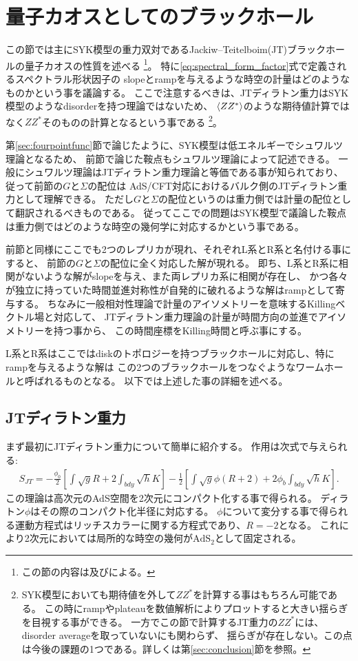 \section{量子カオスとしてのブラックホール\label{sec:gravity}}
この節では主にSYK模型の重力双対であるJackiw--Teitelboim(JT)ブラックホールの量子カオスの性質を述べる
\footnote{この節の内容は\cite{polchinski_chaos}及び\cite{stanford_chaos}による。}。
特に\eqref{eq:spectral_form_factor}式で定義されるスペクトラル形状因子の
slopeとrampを与えるような時空の計量はどのようなものかという事を議論する。
ここで注意するべきは、JTディラトン重力はSYK模型のようなdisorderを持つ理論ではないため、
$\langle ZZ^* \rangle$のような期待値計算ではなく$ZZ^*$そのものの計算となるという事である
\footnote{SYK模型においても期待値を外して$ZZ^*$を計算する事はもちろん可能である。
この時にrampやplateauを数値解析によりプロットすると大きい揺らぎを目視する事ができる。
一方でこの節で計算するJT重力の$ZZ^*$には、disorder averageを取っていないにも関わらず、
揺らぎが存在しない。この点は今後の課題の1つである。詳しくは第\ref{sec:conclusion}節を参照。}。

第\ref{sec:fourpointfunc}節で論じたように、SYK模型は低エネルギーでシュワルツ理論となるため、
前節で論じた鞍点もシュワルツ理論によって記述できる。
一般にシュワルツ理論はJTディラトン重力理論と等価である事が知られており、従って前節の$G$と$\Sigma$の配位は
AdS/CFT対応におけるバルク側のJTディラトン重力として理解できる。
ただし$G$と$\Sigma$の配位というのは重力側では計量の配位として翻訳されるべきものである。
従ってここでの問題はSYK模型で議論した鞍点は重力側ではどのような時空の幾何学に対応するかという事である。

前節と同様にここでも2つのレプリカが現れ、それぞれL系とR系と名付ける事にすると、
前節の$G$と$\Sigma$の配位に全く対応した解が現れる。
即ち、L系とR系に相関がないような解がslopeを与え、また両レプリカ系に相関が存在し、
かつ各々が独立に持っていた時間並進対称性が自発的に破れるような解はrampとして寄与する。
ちなみに一般相対性理論で計量のアイソメトリーを意味するKillingベクトル場と対応して、
JTディラトン重力理論の計量が時間方向の並進でアイソメトリーを持つ事から、
この時間座標をKilling時間と呼ぶ事にする。

L系とR系はここではdiskのトポロジーを持つブラックホールに対応し、特にrampを与えるような解は
この2つのブラックホールをつなぐようなワームホールと呼ばれるものとなる。
以下では上述した事の詳細を述べる。

\subsection{JTディラトン重力}
まず最初にJTディラトン重力について簡単に紹介する。
作用は次式で与えられる:
\begin{align}
	S_{JT} = -\frac{\phi_0}{2}\left[\int \sqrt{g}R + 2\int_{bdy}\sqrt{h}K \right]
			-\frac{1}{2}\left[
				\int \sqrt{g}\phi(R+2) + 2\phi_b\int_{bdy}\sqrt{h}K
			\right].
\end{align}
この理論は高次元のAdS空間を2次元にコンパクト化する事で得られる。
ディラトン$\phi$はその際のコンパクト化半径に対応する。
$\phi$について変分する事で得られる運動方程式はリッチスカラーに関する方程式であり、$R = -2$となる。
これにより2次元においては局所的な時空の幾何が$\mathrm{AdS}_2$として固定される。


\pagebreak